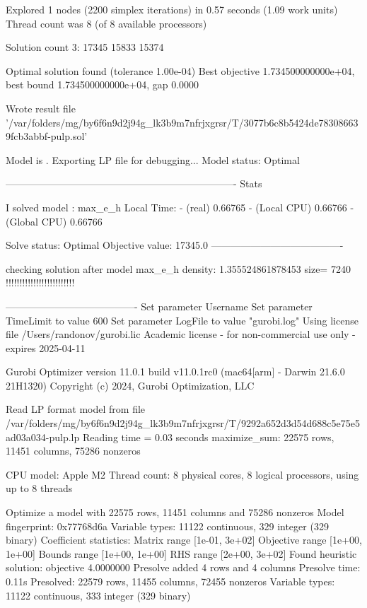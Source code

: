 Explored 1 nodes (2200 simplex iterations) in 0.57 seconds (1.09 work units)
Thread count was 8 (of 8 available processors)

Solution count 3: 17345 15833 15374 

Optimal solution found (tolerance 1.00e-04)
Best objective 1.734500000000e+04, best bound 1.734500000000e+04, gap 0.0000%

Wrote result file '/var/folders/mg/by6f6n9d2j94g_lk3b9m7nfrjxgrsr/T/3077b6c8b5424de783086639fcb3abbf-pulp.sol'

Model is . Exporting LP file for debugging...
Model status: Optimal

----------------------------------------------------------------------
Stats

 I solved model : max_e_h  Local Time:  - (real) 0.66765 - (Local CPU) 0.66766 - (Global CPU) 0.66766

Solve status: Optimal Objective value: 17345.0
----------------------------------------

checking solution after model max_e_h density: 1.355524861878453 size= 7240 !!!!!!!!!!!!!!!!!!!!!!!!!

----------------------------------------
Set parameter Username
Set parameter TimeLimit to value 600
Set parameter LogFile to value "gurobi.log"
Using license file /Users/randonov/gurobi.lic
Academic license - for non-commercial use only - expires 2025-04-11

Gurobi Optimizer version 11.0.1 build v11.0.1rc0 (mac64[arm] - Darwin 21.6.0 21H1320)
Copyright (c) 2024, Gurobi Optimization, LLC

Read LP format model from file /var/folders/mg/by6f6n9d2j94g_lk3b9m7nfrjxgrsr/T/9292a652d3d54d688c5e75e5ad03a034-pulp.lp
Reading time = 0.03 seconds
maximize_sum: 22575 rows, 11451 columns, 75286 nonzeros

CPU model: Apple M2
Thread count: 8 physical cores, 8 logical processors, using up to 8 threads

Optimize a model with 22575 rows, 11451 columns and 75286 nonzeros
Model fingerprint: 0x77768d6a
Variable types: 11122 continuous, 329 integer (329 binary)
Coefficient statistics:
  Matrix range     [1e-01, 3e+02]
  Objective range  [1e+00, 1e+00]
  Bounds range     [1e+00, 1e+00]
  RHS range        [2e+00, 3e+02]
Found heuristic solution: objective 4.0000000
Presolve added 4 rows and 4 columns
Presolve time: 0.11s
Presolved: 22579 rows, 11455 columns, 72455 nonzeros
Variable types: 11122 continuous, 333 integer (329 binary)

